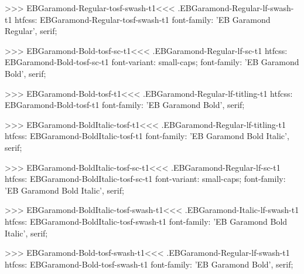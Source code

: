 {{{{{{{>>>
\<EBGaramond-Regular-tosf-swash-t1\><<<
.EBGaramond-Regular-lf-swash-t1
htfcss:  EBGaramond-Regular-tosf-swash-t1  font-family: 'EB Garamond Regular', serif;

>>>
\<EBGaramond-Bold-tosf-sc-t1\><<<
.EBGaramond-Regular-lf-sc-t1
htfcss:  EBGaramond-Bold-tosf-sc-t1  font-variant: small-caps; font-family: 'EB Garamond Bold', serif;

>>>
\<EBGaramond-Bold-tosf-t1\><<<
.EBGaramond-Regular-lf-titling-t1
htfcss:  EBGaramond-Bold-tosf-t1  font-family: 'EB Garamond Bold', serif;

>>>
\<EBGaramond-BoldItalic-tosf-t1\><<<
.EBGaramond-Regular-lf-titling-t1
htfcss:  EBGaramond-BoldItalic-tosf-t1  font-family: 'EB Garamond Bold Italic', serif;

>>>
\<EBGaramond-BoldItalic-tosf-sc-t1\><<<
.EBGaramond-Regular-lf-sc-t1
htfcss:  EBGaramond-BoldItalic-tosf-sc-t1  font-variant: small-caps; font-family: 'EB Garamond Bold Italic', serif;

>>>
\<EBGaramond-BoldItalic-tosf-swash-t1\><<<
.EBGaramond-Italic-lf-swash-t1
htfcss:  EBGaramond-BoldItalic-tosf-swash-t1  font-family: 'EB Garamond Bold Italic', serif;

>>>
\<EBGaramond-Bold-tosf-swash-t1\><<<
.EBGaramond-Regular-lf-swash-t1
htfcss:  EBGaramond-Bold-tosf-swash-t1  font-family: 'EB Garamond Bold', serif;

}}}}}}}
